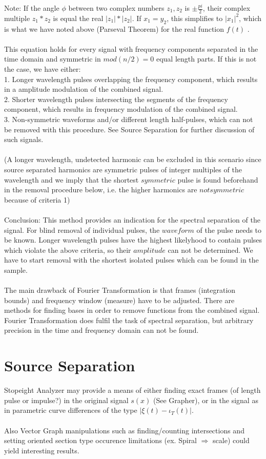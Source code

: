 \documentclass{report}
\begin{document}
Note: If the angle $\phi$ between two complex numbers $z_{1},z_{2}$ is $\pm\frac{pi}{2}$, their complex multiple $z_{1}*z_{2}$ is equal the real $\lvert z_{1}\rvert*\lvert z_{2}\rvert$. If $x_{1}=y_{2}$, this simplifies to $\lvert x_{1} \rvert ^2$, which is what we have noted above (Parseval Theorem) for the real function $f(t)$ .\\\\
This equation holds for every signal with frequency components separated in the time domain and symmetric in $mod(n/2)=0$ equal length parts. If this is not the case, we have either:\\
1. Longer wavelength pulses overlapping the frequency component, which results in a amplitude modulation of the combined signal.\\
2. Shorter wavelength pulses intersecting the segments of the frequency component, which results in frequency modulation of the combined signal.\\
3. Non-symmetric waveforms and/or different length half-pulses, which can not be removed with this procedure. See Source Separation for further discussion of such signals.\\\\
(A longer wavelength, undetected harmonic can be excluded in this scenario since source separated harmonics are symmetric pulses of integer multiples of the wavelength and we imply that the shortest $symmetric$ pulse is found beforehand in the removal procedure below, i.e. the higher harmonics are $not symmetric$ because of criteria 1)\\\\
Conclusion: This method provides an indication for the spectral separation of the signal. For blind removal of individual pulses, the $waveform$ of the pulse needs to be known. Longer wavelength pulses have the highest likelyhood to contain pulses which violate the above criteria, so their $amplitude$ can not be determined. We have to start removal with the shortest isolated pulses which can be found in the sample.\\\\
The main drawback of Fourier Transformation is that frames (integration bounds) and frequency window (measure) have to be adjusted. There are methods for finding bases in order to remove functions from the combined signal. Fourier Transformation does fulfil the task of spectral separation, but arbitrary precision in the time and frequency domain can not be found.

\chapter{Source Separation}
Stopeight Analyzer may provide a means of either finding exact frames (of length pulse or impulse?) in the original signal $s(x)$ (See Grapher), or in the signal as in parametric curve differences of the type $\lvert \xi(t)-\iota_{T}(t) \rvert$.\\\\
Also Vector Graph manipulations such as finding/counting intersections and setting oriented section type occurence limitations (ex. Spiral $\Rightarrow$ scale) could yield interesting results.

\iffalse
\printbibliography
\fi
{}

\end{document}
